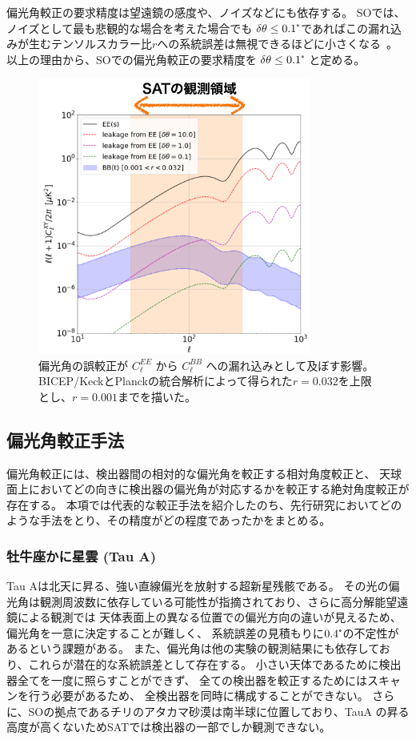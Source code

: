 \documentclass[../../main.tex]{subfiles}
\begin{document}
偏光角較正の要求精度は望遠鏡の感度や、ノイズなどにも依存する。
SOでは、ノイズとして最も悲観的な場合を考えた場合でも
$\delta\theta \leq 0.1\tcdegree$であればこの漏れ込みが生むテンソルスカラー比$r$への系統誤差は無視できるほどに小さくなる~\cite{so:Bryan_2018}。
以上の理由から、SOでの偏光角較正の要求精度を $\delta\theta \leq 0.1\tcdegree$ と定める。

\begin{figure}[H]
    \centering
    \includegraphics[width=0.80\textwidth]{simons_observatory/EtoB_leakage.pdf}
    \caption{偏光角の誤較正が $C_{\ell}^{EE}$ から $C_{\ell}^{BB}$ への漏れ込みとして及ぼす影響。
    BICEP/KeckとPlanckの統合解析によって得られた$r=0.032$を上限とし、$r=0.001$までを描いた。}
    \label{fig:so-EtoBleakage}
\end{figure}

\subsection{偏光角較正手法}
偏光角較正には、検出器間の相対的な偏光角を較正する相対角度較正と、
天球面上においてどの向きに検出器の偏光角が対応するかを較正する絶対角度較正が存在する。
本項では代表的な較正手法を紹介したのち、先行研究においてどのような手法をとり、その精度がどの程度であったかをまとめる。
\subsubsection{牡牛座かに星雲 (Tau A)}
Tau Aは北天に昇る、強い直線偏光を放射する超新星残骸である。
その光の偏光角は観測周波数に依存している可能性が指摘されており、さらに高分解能望遠鏡による観測では
天体表面上の異なる位置での偏光方向の違いが見えるため、偏光角を一意に決定することが難しく、
系統誤差の見積もりに$0.4\tcdegree$の不定性があるという課題がある。
また、偏光角は他の実験の観測結果にも依存しており、これらが潜在的な系統誤差として存在する。
小さい天体であるために検出器全てを一度に照らすことができず、
全ての検出器を較正するためにはスキャンを行う必要があるため、
全検出器を同時に構成することができない。
さらに、SOの拠点であるチリのアタカマ砂漠は南半球に位置しており、TauA の昇る高度が高くないためSATでは検出器の一部でしか観測できない。
\end{document}
